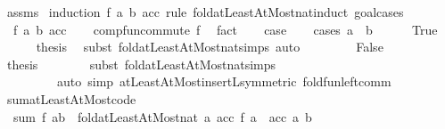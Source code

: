 \begin{isabellebody}
%
\isadelimproof
%
\endisadelimproof
%
\isatagproof
{}\isamarkupfalse%
\ assms\isanewline
{}\isamarkupfalse%
\ {\isacharparenleft}{\kern0pt}induction\ f\ a\ b\ acc\ rule{\isacharcolon}{\kern0pt}\ fold{\isacharunderscore}{\kern0pt}atLeastAtMost{\isacharunderscore}{\kern0pt}nat{\isachardot}{\kern0pt}induct{\isacharcomma}{\kern0pt}\ goal{\isacharunderscore}{\kern0pt}cases{\isacharparenright}{\kern0pt}\isanewline
\ \ \isamarkupfalse%
\ {\isacharparenleft}{\kern0pt}{}\ f\ a\ b\ acc{\isacharparenright}{\kern0pt}\isanewline
\ \ \isamarkupfalse%
\ comp{\isacharunderscore}{\kern0pt}fun{\isacharunderscore}{\kern0pt}commute\ f\ \isamarkupfalse%
\ fact\isanewline
\ \ \isamarkupfalse%
\ {\isacharquery}{\kern0pt}case\isanewline
\ \ \isamarkupfalse%
\ {\isacharparenleft}{\kern0pt}cases\ {\isachardoublequoteopen}a\ {\isachargreater}{\kern0pt}\ b{\isachardoublequoteclose}{\isacharparenright}{\kern0pt}\isanewline
\ \ \ \ \isamarkupfalse%
\ True\isanewline
\ \ \ \ \isamarkupfalse%
\ {\isacharquery}{\kern0pt}thesis\ \isamarkupfalse%
\ {\isacharparenleft}{\kern0pt}subst\ fold{\isacharunderscore}{\kern0pt}atLeastAtMost{\isacharunderscore}{\kern0pt}nat{\isachardot}{\kern0pt}simps{\isacharparenright}{\kern0pt}\ auto\isanewline
\ \ \isamarkupfalse%
\isanewline
\ \ \ \ \isamarkupfalse%
\ False\isanewline
\ \ \ \ \isamarkupfalse%
\ {}\ \isamarkupfalse%
\ {\isacharquery}{\kern0pt}thesis\isanewline
\ \ \ \ \ \ \isamarkupfalse%
\ {\isacharparenleft}{\kern0pt}subst\ fold{\isacharunderscore}{\kern0pt}atLeastAtMost{\isacharunderscore}{\kern0pt}nat{\isachardot}{\kern0pt}simps{\isacharparenright}{\kern0pt}\isanewline
\ \ \ \ \ \ \ \ \ {\isacharparenleft}{\kern0pt}auto\ simp{\isacharcolon}{\kern0pt}\ atLeastAtMost{\isacharunderscore}{\kern0pt}insertL{\isacharbrackleft}{\kern0pt}symmetric{\isacharbrackright}{\kern0pt}\ fold{\isacharunderscore}{\kern0pt}fun{\isacharunderscore}{\kern0pt}left{\isacharunderscore}{\kern0pt}comm{\isacharparenright}{\kern0pt}\isanewline
\ \ \isamarkupfalse%
\isanewline
{}\isamarkupfalse%
%
\endisatagproof
{\isafoldproof}%
%
\isadelimproof
\isanewline
%
\endisadelimproof
\isanewline
{}\isamarkupfalse%
\ sum{\isacharunderscore}{\kern0pt}atLeastAtMost{\isacharunderscore}{\kern0pt}code{\isacharcolon}{\kern0pt}\isanewline
\ \ {\isachardoublequoteopen}sum\ f\ {\isacharbraceleft}{\kern0pt}a{\isachardot}{\kern0pt}{\isachardot}{\kern0pt}b{\isacharbraceright}{\kern0pt}\ {\isacharequal}{\kern0pt}\ fold{\isacharunderscore}{\kern0pt}atLeastAtMost{\isacharunderscore}{\kern0pt}nat\ {\isacharparenleft}{\kern0pt}{\isasymlambda}a\ acc{\isachardot}{\kern0pt}\ f\ a\ {\isacharplus}{\kern0pt}\ acc{\isacharparenright}{\kern0pt}\ a\ b\ {}{\isachardoublequoteclose}\isanewline

\end{isabellebody}
